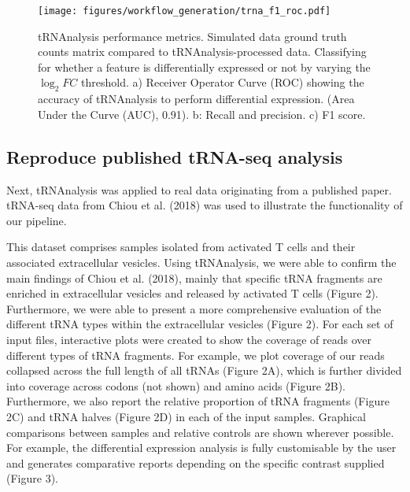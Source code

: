 \begin{figure}[htb]
\centering
\texttt{[image: figures/workflow\_generation/trna\_f1\_roc.pdf]}
\caption[tRNAnalysis performance metrics]{tRNAnalysis performance metrics.
Simulated data ground truth counts matrix compared to tRNAnalysis-processed data.
Classifying for whether a feature is differentially expressed or not by varying the $\log_{2}FC$ threshold.
a) Receiver Operator Curve (ROC) showing the accuracy of tRNAnalysis to perform differential expression. (Area Under the Curve (AUC), 0.91).
b: Recall and precision.
c) F1 score.}
\label{fig:trna_f1_roc}
\end{figure}

\subsection{Reproduce published tRNA-seq analysis}
Next, tRNAnalysis was applied to real data originating from a published paper.
tRNA-seq data from Chiou et al. (2018) \cite{chiou2018selective} was used to illustrate the functionality of our pipeline.

This dataset comprises samples isolated from activated T cells and their associated extracellular vesicles.
Using tRNAnalysis, we were able to confirm the main findings of Chiou et al. (2018), mainly that specific tRNA fragments are enriched in extracellular vesicles and released by activated T cells (Figure 2).
Furthermore, we were able to present a more comprehensive evaluation of the different tRNA types within the extracellular vesicles (Figure 2).
For each set of input files, interactive plots were created to show the coverage of reads over different types of tRNA fragments.
For example, we plot coverage of our reads collapsed across the full length of all tRNAs (Figure 2A), which is further divided into coverage across codons (not shown) and amino acids (Figure 2B).
Furthermore, we also report the relative proportion of tRNA fragments (Figure 2C) and tRNA halves (Figure 2D) in each of the input samples.
Graphical comparisons between samples and relative controls are shown wherever possible.
For example, the differential expression analysis is fully customisable by the user and generates comparative reports depending on the specific contrast supplied (Figure 3).
